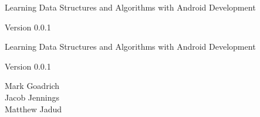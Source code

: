 \documentclass[10pt]{book}
\newcommand{\thetitle}{Learning Data Structures and Algorithms with Android Development}
\newcommand{\theversion}{0.0.1}
\begin{document}
\frontmatter





\begin{latexonly}

\renewcommand{\blankpage}{\thispagestyle{empty} \quad \newpage}


\thispagestyle{empty}

\begin{flushright}
\vspace*{2.5in}

\begin{spacing}{3}
{\huge \thetitle}
\end{spacing}

\vspace{0.25in}

Version \theversion

\vfill

\end{flushright}


\blankpage
\blankpage

\pagebreak
\thispagestyle{empty}

\begin{flushright}
\vspace*{2.5in}

\begin{spacing}{3}
{\huge \thetitle}
\end{spacing}

\vspace{0.25in}

Version \theversion

\vspace{1in}


{\Large
Mark Goadrich\\
Jacob Jennings\\
Matthew Jadud\\
}


\vspace{0.5in}

\vfill

\end{flushright}



\end{latexonly}
\end{document}
